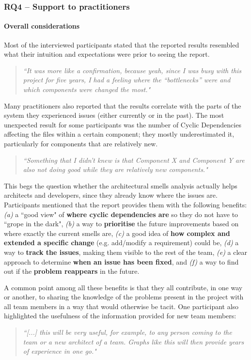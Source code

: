 \subsubsection{RQ4 -- Support to practitioners}\label{c4:sec:results-rq-4}
\paragraph{Overall considerations}
Most of the interviewed participants stated that the reported results resembled what their intuition and expectations were prior to seeing the report.
\begin{quote}
    \emph{``It was more like a confirmation, because yeah, since I was busy with this project for five years, I had a feeling where the “bottlenecks” were and which components were changed the most."}
\end{quote}
Many practitioners also reported that the results correlate with the parts of the system they experienced issues (either currently or in the past).
The most unexpected result for some participants was the number of Cyclic Dependencies affecting the files within a certain component; they mostly underestimated it, particularly for components that are relatively new.
\begin{quote}
   \emph{``Something that I didn't knew is that Component X and Component Y are also not doing good while they are relatively new components."}
\end{quote}

This begs the question whether the architectural smells analysis actually helps architects and developers, since they already know where the issues are. Participants mentioned that the report provides them with the following benefits: \emph{(a)} a ``good view" of \textbf{where cyclic dependencies are} so they do not have to ``grope in the dark", \emph{(b)} a way to \textbf{prioritise} the future improvements based on where exactly the current smells are, \emph{(c)} a good idea of \textbf{how complex and extended a specific change} (e.g. add/modify a requirement) could be, \emph{(d)} a way to \textbf{track the issues}, making them visible to the rest of the team, \emph{(e)} a clear approach to determine \textbf{when an issue has been fixed}, and \emph{(f)} a way to find out if the \textbf{problem reappears} in the future.

A common point among all these benefits is that they all contribute, in one way or another, to sharing the knowledge of the problems present in the project with all team members in a way that would otherwise be tacit.
One participant also highlighted the usefulness of the information provided for new team members:
\begin{quote}
    \emph{``[...] this will be very useful, for example, to any person coming to the team or a new architect of a team. Graphs like this will then provide years of experience in one go."}
\end{quote}

